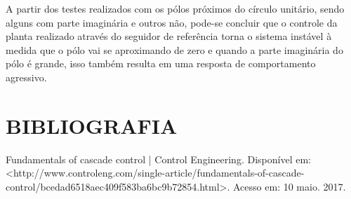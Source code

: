 \documentclass[a4paper,12pt]{article}
\begin{document}
\hspace{4ex}A partir dos testes realizados com os pólos próximos do círculo unitário, sendo alguns com parte imaginária e outros não, pode-se concluir que o controle da planta realizado através do seguidor de referência torna o sistema instável à medida que o pólo vai se aproximando de zero e quando a parte imaginária do pólo é grande, isso também resulta em uma resposta de comportamento agressivo.

\newpage

\thispagestyle{empty}
\section{BIBLIOGRAFIA}

Fundamentals of cascade control | Control Engineering. Disponível em: <http://www.controleng.com/single-article/fundamentals-of-cascade-control/bcedad6518aec409f583ba6bc9b72854.html>. Acesso em: 10 maio. 2017.





%


%
\end{document}
